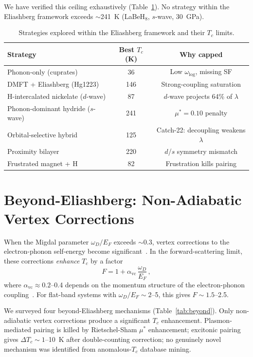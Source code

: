 \documentclass[aps,prb,reprint,superscriptaddress,longbibliography]{revtex4-2}
\begin{document}
We have verified this ceiling exhaustively (Table~\ref{tab:strategies}). No strategy within the Eliashberg framework exceeds $\sim$241~K (LaBeH$_8$, $s$-wave, 30~GPa).

\begin{table}[h]
\caption{Strategies explored within the Eliashberg framework and their $T_c$ limits.}
\label{tab:strategies}
\begin{ruledtabular}
\begin{tabular}{lcc}
Strategy & Best $T_c$ (K) & Why capped \\
\hline
Phonon-only (cuprates) & 36 & Low $\omega_{\log}$, missing SF \\
DMFT + Eliashberg (Hg1223) & 146 & Strong-coupling saturation \\
H-intercalated nickelate ($d$-wave) & 87 & $d$-wave projects 64\% of $\lambda$ \\
Phonon-dominant hydride ($s$-wave) & 241 & $\mu^* = 0.10$ penalty \\
Orbital-selective hybrid & 125 & Catch-22: decoupling weakens $\lambda$ \\
Proximity bilayer & 220 & $d$/$s$ symmetry mismatch \\
Frustrated magnet + H & 82 & Frustration kills pairing \\
\end{tabular}
\end{ruledtabular}
\end{table}

\section{Beyond-Eliashberg: Non-Adiabatic Vertex Corrections}
\label{sec:vertex}

When the Migdal parameter $\omega_D/E_F$ exceeds $\sim$0.3, vertex corrections to the electron-phonon self-energy become significant~\cite{Pietronero1995}. In the forward-scattering limit, these corrections \emph{enhance} $T_c$ by a factor
\begin{equation}
    F = 1 + \alpha_{\mathrm{vc}}\,\frac{\omega_D}{E_F}\,,
    \label{eq:vertex}
\end{equation}
where $\alpha_{\mathrm{vc}} \approx 0.2$--0.4 depends on the momentum structure of the electron-phonon coupling~\cite{Grimaldi1995}. For flat-band systems with $\omega_D/E_F \sim 2$--5, this gives $F \sim 1.5$--2.5.

We surveyed four beyond-Eliashberg mechanisms (Table~\ref{tab:beyond}). Only non-adiabatic vertex corrections produce a significant $T_c$ enhancement. Plasmon-mediated pairing is killed by Rietschel-Sham $\mu^*$ enhancement; excitonic pairing gives $\Delta T_c \sim 1$--10~K after double-counting correction; no genuinely novel mechanism was identified from anomalous-$T_c$ database mining.
\end{document}
